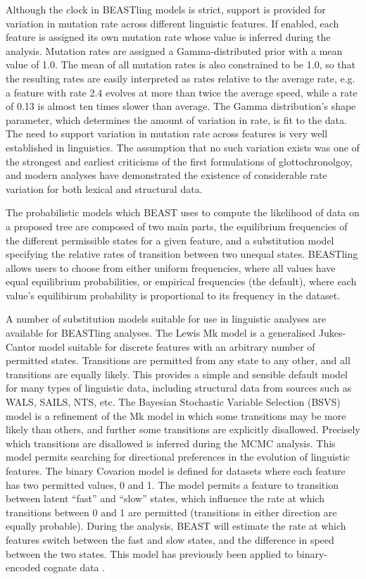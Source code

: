 \documentclass[twocolumn,10pt]{scrartcl}
\begin{document}
Although the clock in BEASTling models is strict, support is provided for variation in mutation rate across different linguistic features.  If enabled, each feature is assigned its own mutation rate whose value is inferred during the analysis.  Mutation rates are assigned a Gamma-distributed prior with a mean value of 1.0.  The mean of all mutation rates is also constrained to be 1.0, so that the resulting rates are easily interpreted as rates relative to the average rate, e.g. a feature with rate 2.4 evolves at more than twice the average speed, while a rate of 0.13 is almost ten times slower than average.  The Gamma distribution's shape parameter, which determines the amount of variation in rate, is fit to the data.  The need to support variation in mutation rate across features is very well established in linguistics.  The assumption that no such variation exists was one of the strongest and earliest criticisms of the first formulations of glottochronolgoy, and modern analyses have demonstrated the existence of considerable rate variation for both lexical\cite{Pagel2007} and structural\cite{Greenhill2010} data.

The probabilistic models which BEAST uses to compute the likelihood of data on a proposed tree are composed of two main parts, the equilibrium frequencies of the different permissible states for a given feature, and a substitution model specifying the relative rates of transition between two unequal states.  BEASTling allows users to choose from either uniform frequencies, where all values have equal equilibrium probabilities, or empirical frequencies (the default), where each value's equilibirum probability is proportional to its frequency in the dataset.

A number of substitution models suitable for use in linguistic analyses are available for BEASTling analyses.  The Lewis Mk model\cite{Lewis2001} is a generalised Jukes-Cantor model suitable for discrete features with an arbitrary number of permitted states.  Transitions are permitted from any state to any other, and all transitions are equally likely.  This provides a simple and sensible default model for many types of linguistic data, including structural data from sources such as WALS\cite{Dryer2013}, SAILS\cite{Muysken2014}, NTS, etc.  The Bayesian Stochastic Variable Selection (BSVS) model is a refinement of the Mk model in which some transitions may be more likely than others, and further some transitions are explicitly disallowed.  Precisely which transitions are disallowed is inferred during the MCMC analysis.  This model permits searching for directional preferences in the evolution of linguistic features.  The binary Covarion model\cite{Penny2001} is defined for datasets where each feature has two permitted values, 0 and 1.  The model permits a feature to transition between latent ``fast'' and ``slow'' states, which influence the rate at which transitions between 0 and 1 are permitted (transitions in either direction are equally probable).  During the analysis, BEAST will estimate the rate at which features switch between the fast and slow states, and the difference in speed between the two states.  This model has previously been applied to binary-encoded cognate data \cite{Bouckaert2012}.
\end{document}
